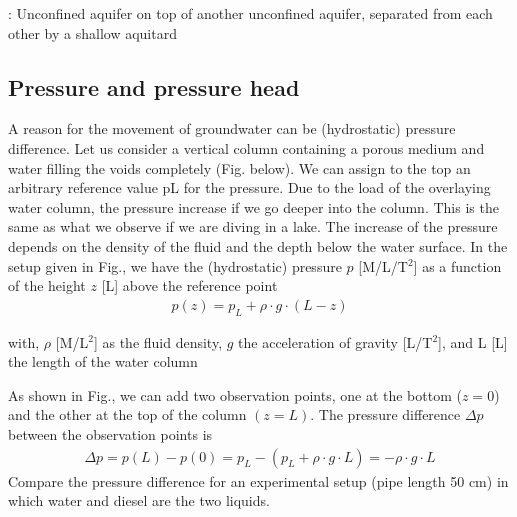 \documentclass[letterpaper,10pt,english]{sphinxmanual}
\let\sphinxpxdimen\pdfpxdimen\else\newdimen\sphinxpxdimen
\begin{document}
\noindent{\hspace*{\fill}\sphinxincludegraphics[width=600\sphinxpxdimen]{{L03_f_10}.png}\hspace*{\fill}}

: Unconfined aquifer on top of another unconfined aquifer, separated from each other by a shallow aquitard


\subsection{Pressure and pressure head}
\label{\detokenize{contents/flow/lecture_03/13_gw_storage:pressure-and-pressure-head}}
A reason for the movement of groundwater can be (hydrostatic) pressure difference. Let us consider a vertical column containing a porous medium and water filling the voids completely (Fig. below). We can assign to the top an arbitrary reference value pL for the pressure.  Due to the load of the overlaying water column, the pressure increase if we go deeper into the column. This is the same as what we observe if we are diving in a lake. The increase of the pressure depends on the density of the fluid and the depth below the water surface. In the setup given in Fig., we have the (hydrostatic) pressure \(p\) {[}M/L/T\(^2\){]} as a function of the height \(z\) {[}L{]} above the reference point
\begin{equation*}
\begin{split}
p(z) = p_L + \rho \cdot g \cdot (L - z)
\end{split}
\end{equation*}
\begin{sphinxShadowBox}

with, 
\(\rho\) {[}M/L\(^2\){]} as the fluid density, 
\(g\) the acceleration of gravity {[}L/T\(^2\){]}, and  
L {[}L{]} the length of the water column
\end{sphinxShadowBox}

\noindent{\hspace*{\fill}\sphinxincludegraphics[width=500\sphinxpxdimen]{{L03_f_11}.png}\hspace*{\fill}}

As shown in Fig., we can add two observation points, one at the bottom (\(z = 0\)) and the other at the top of the column \((z=L)\). The pressure difference \(\Delta p\) between the observation points is
\begin{equation*}
\begin{split}
\Delta p = p(L) - p(0) = p_L - (p_L + \rho\cdot g \cdot L) = - \rho\cdot g \cdot L
\end{split}
\end{equation*}
 Compare the pressure difference for an experimental setup (pipe length 50 cm) in which water and diesel are the two liquids.
\end{document}
